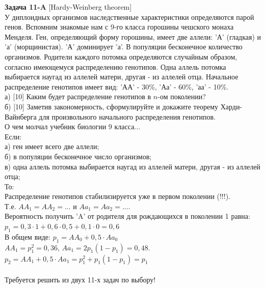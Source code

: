\documentclass[12pt, a4paper]{article}\usepackage[]{graphicx}\usepackage[]{color}
\begin{document}
	{\bf Задача 11-A} [Hardy-Weinberg theorem]\\
	У диплоидных организмов наследственные характеристики определяются
	парой генов. Вспомним знакомые нам с 9-го класса горошины чешского
	монаха Менделя. Ген, определяющий форму горошины, имеет две
	аллели:  'А' (гладкая) и 'а' (морщинистая). 'А' доминирует 'а'. В
	популяции бесконечное количество организмов. Родители каждого
	потомка определяются случайным образом, согласно имеющемуся
	распределению генотипов. Одна аллель потомка выбирается наугад из
	аллелей матери, другая - из аллелей отца. Начальное распределение
	генотипов имеет вид: 'АА' - 30\%, 'Аа' - 60\%, 'аа' - 10\%. \\
	а) [10] Каким будет распределение генотипов в $n$-ом поколении? \\
	б) [10] Заметив закономерность, сформулируйте и докажите теорему
	Харди-Вайнберга для произвольного начального распределения
	генотипов. \\
	О чем молчал учебник биологии 9 класса... \\
	Если: \\
	а) ген имеет всего две аллели; \\
	б) в популяции бесконечное число организмов; \\
	в) одна аллель потомка выбирается наугад из аллелей матери, другая
	- из аллелей отца; \\
	То: \\
	Распределение генотипов стабилизируется уже в первом поколении
	(!!!). \\
	Т.е.
	$AA_{1}=AA_{2}=...$ и $Aa_{1}=Aa_{2}=...$. \\
	Вероятность получить 'A' от родителя для рождающихся в поколении 1
	равна: $p_{1}=0,3\cdot 1+0,6\cdot 0,5 + 0,1\cdot 0=0,6$ \\
	В общем виде: $p_{1}=AA_{0}+0,5\cdot Aa_{0}$ \\
	$AA_{1}=p_{1}^{2}=0,36$, $Aa_{1}=2p_{1}(1-p_{1})=0,48$. \\
	$p_{2}=AA_{1}+0,5\cdot Aa_{1}=p_{1}^{2}+p_{1}(1-p_{1})=p_{1}$ \\
	\\


	Требуется решить {\bf {}} из двух 11-х задач по
	выбору! \\
\end{document}
